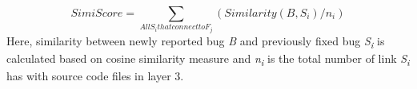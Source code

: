 \documentclass[conference]{IEEEtran}
\begin{document}
\begin{equation}\label{Simiequation}
SimiScore=\sum_{All S_{i} that connect to F_{j}}(Similarity(B,S_{i})/n_{i})
\end{equation} 
Here, similarity between newly reported bug \textit{B} and previously fixed bug \textit{S\textsubscript{i}} is calculated based on cosine similarity measure and \textit{n\textsubscript{i}} is the total number of link \textit{S\textsubscript{i}} has with source code files in layer 3.

\end{document}
